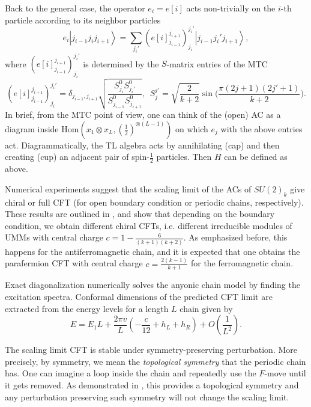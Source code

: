 \documentclass[twoside,11pt,titlepage]{amsart}
\newcommand{\ket}[1]{\left| #1 \right>} %
\renewcommand{\=}[1]{\stackrel{#1}{=}} %
\theoremstyle{definition}
\theoremstyle{remark}
\begin{document}
Back to the general case, the operator $e_i=e[i]$ acts non-trivially on the $i$-th particle according to its neighbor particles
$$e_i\ket{j_{i-1}j_ij_{i+1}}=\sum_{j_i'}(e[i]_{j_{i-1}}^{j_{i+1}})_{j_i}^{j_i'}\ket{j_{i-1}j_i'j_{i+1}},$$
where $(e[i]_{j_{i-1}}^{j_{i+1}})_{j_i}^{j_i'}$ is determined by the $S$-matrix entries of the MTC
$$(e[i]_{j_{i-1}}^{j_{i+1}})_{j_i}^{j_i'}=\delta_{j_{i-1},j_{i+1}}\sqrt{\frac{S_{j_i}^0S_{j_i'}^0}{S_{j_{i-1}}^0S_{j_{i+1}}^0}}, \ \ S_j^{j'}=\sqrt{\frac{2}{k+2}}\sin\Big(\frac{\pi(2j+1)(2j'+1)}{k+2}\Big).$$
In brief, from the MTC point of view, one can think of the (open) AC as a diagram inside $\text{Hom}(x_1 \otimes x_L, (\frac{1}{2})^{\otimes (L-1)})$ on which $e_j$ with the above entries act. Diagrammatically, the TL algebra acts by annihilating (cap) and then creating (cup) an adjacent pair of spin-$\frac{1}{2}$ particles. Then $H$ can be defined as above. 

Numerical experiments suggest that the scaling limit of the ACs of $SU(2)_k$ give chiral or full CFT (for open boundary condition or periodic chains, respectively). These results are outlined in \cite{gils2013anyonic,feiguin2007interacting}, and show that depending on the boundary condition, we obtain different chiral CFTs, i.e. different irreducible modules of UMMs with central charge $c=1-\frac{6}{(k+1)(k+2)}$. As emphasized before, this happens for the antiferromagnetic chain, and it is expected that one obtains the parafermion CFT with central charge $c=\frac{2(k-1)}{k+1}$ for the ferromagnetic chain.

Exact diagonalization numerically solves the anyonic chain model by finding the excitation spectra. Conformal dimensions of the predicted CFT limit are extracted from the energy levels for a length $L$ chain given by 
$$ E=E_1L+\frac{2\pi v}{L}(-\frac{c}{12}+h_L+h_R)+O(\frac{1}{L^2}).$$

The scaling limit CFT is stable under symmetry-preserving perturbation. More precisely, by symmetry, we mean the \textit{topological symmetry} that the periodic chain has. One can imagine a loop \cite[Fig. 3]{gils2013anyonic} inside the chain and repeatedly use the $F$-move until it gets removed. As demonstrated in \cite{gils2013anyonic,feiguin2007interacting}, this provides a topological symmetry and any perturbation preserving such symmetry will not change the scaling limit.
\end{document}
